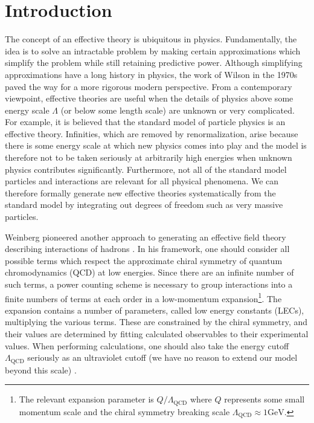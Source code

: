 \chapter{\label{chap:Introduction}Introduction}

The concept of an effective theory is ubiquitous in physics. Fundamentally, the idea is to solve an intractable problem by making certain approximations which simplify the problem while still retaining predictive power. Although simplifying approximations have a long history in physics,  the work of Wilson \cite{Wilson197475} in the 1970s paved the way for a more rigorous modern perspective. From a contemporary viewpoint, effective theories are useful when the details of physics above some energy scale $\Lambda$ (or below some length scale) are unknown or very complicated. For example, it is believed that the standard model of particle physics is an effective theory. Infinities, which are removed by renormalization, arise because there is some energy scale at which new physics comes into play and the model is therefore not to be taken seriously at arbitrarily high energies when unknown physics contributes significantly. Furthermore, not all of the standard model particles and interactions are relevant for all physical phenomena. We can therefore formally generate new effective theories systematically from the standard model by integrating out degrees of freedom such as very massive particles.

Weinberg pioneered another approach to generating an effective field theory describing interactions of hadrons \cite{WEINBERG1990288}. In his framework, one should consider all possible terms which respect the approximate chiral symmetry of quantum chromodynamics (QCD) at low energies. Since there are an infinite number of such terms, a power counting scheme is necessary to group interactions into a finite numbers of terms at each order in a low-momentum expansion\footnote{The relevant expansion parameter is $Q/\Lambda_{\text{QCD}}$ where $Q$ represents some small momentum scale and the chiral symmetry breaking scale $\Lambda_{\text{QCD}}\approx 1\text{GeV}$.}. The expansion contains a number of parameters, called low energy constants (LECs), multiplying the various terms. These are constrained by the chiral symmetry, and their values are determined by fitting calculated observables to their experimental values. When performing calculations, one should also take the energy cutoff $\Lambda_{\text{QCD}}$ seriously as an ultraviolet cutoff (we have no reason to extend our model beyond this scale) \cite{Epelbaum2013}. 

